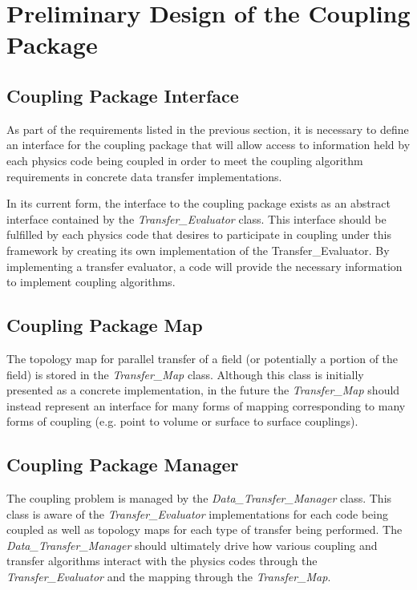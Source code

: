 \documentclass[letterpaper]{article}
\begin{document}
\section{Preliminary Design of the Coupling Package}

\subsection{Coupling Package Interface}
As part of the requirements listed in the previous section, it is
necessary to define an interface for the coupling package that will
allow access to information held by each physics code being coupled in
order to meet the coupling algorithm requirements in concrete data
transfer implementations.

In its current form, the interface to the coupling package exists as
an abstract interface contained by the {\sl Transfer\_Evaluator}
class. This interface should be fulfilled by each physics code that
desires to participate in coupling under this framework by creating
its own implementation of the Transfer\_Evaluator. By implementing a
transfer evaluator, a code will provide the necessary information to
implement coupling algorithms.

\subsection{Coupling Package Map}
The topology map for parallel transfer of a field (or potentially a
portion of the field) is stored in the {\sl Transfer\_Map}
class. Although this class is initially presented as a concrete
implementation, in the future the {\sl Transfer\_Map} should instead
represent an interface for many forms of mapping corresponding to many
forms of coupling (e.g. point to volume or surface to surface
couplings). 

\subsection{Coupling Package Manager}
The coupling problem is managed by the {\sl Data\_Transfer\_Manager}
class. This class is aware of the {\sl Transfer\_Evaluator} implementations
for each code being coupled as well as topology maps for each type of 
transfer being performed. The {\sl Data\_Transfer\_Manager} should
ultimately drive how various coupling and transfer algorithms interact
with the physics codes through the {\sl Transfer\_Evaluator} and the mapping
through the {\sl Transfer\_Map}. 
\end{document}
